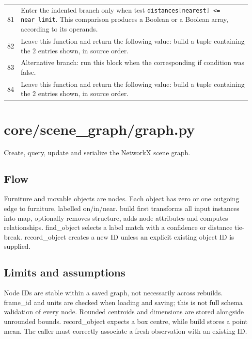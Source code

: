 \documentclass[11pt,a4paper]{book}
\begin{document}
\begin{longtable}{r p{}}
81 & Enter the indented branch only when test \texttt{distances[nearest] <= near\_limit}. This comparison produces a Boolean or a Boolean array, according to its operands. \\

82 & Leave this function and return the following value: build a tuple containing the 2 entries shown, in source order. \\

83 & Alternative branch: run this block when the corresponding if condition was false. \\

84 & Leave this function and return the following value: build a tuple containing the 2 entries shown, in source order. \\

\end{longtable}

\chapter{core/scene\_graph/graph.py}

Create, query, update and serialize the NetworkX scene graph.

\section*{Flow}

Furniture and movable objects are nodes. Each object has zero or one outgoing edge to furniture, labelled on/in/near. build first transforms all input instances into map, optionally removes structure, adds node attributes and computes relationships. find\_object selects a label match with a confidence or distance tie-break. record\_object creates a new ID unless an explicit existing object ID is supplied.

\section*{Limits and assumptions}

Node IDs are stable within a saved graph, not necessarily across rebuilds. frame\_id and units are checked when loading and saving; this is not full schema validation of every node. Rounded centroids and dimensions are stored alongside unrounded bounds. record\_object expects a box centre, while build stores a point mean. The caller must correctly associate a fresh observation with an existing ID.
\end{document}
